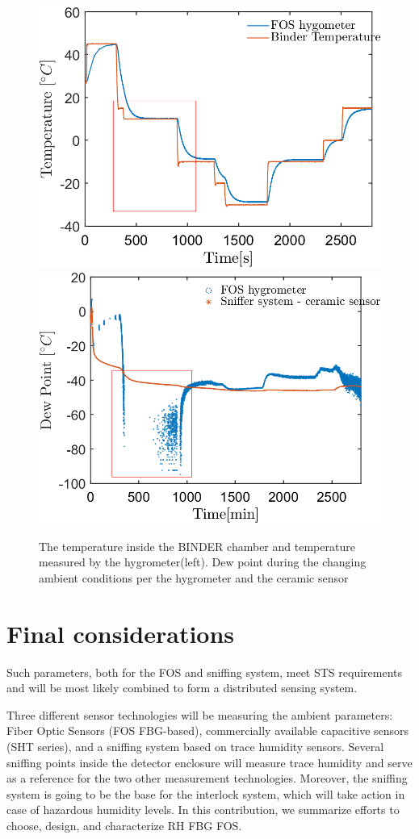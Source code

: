\begin{figure}[!h]
\centering
\includegraphics[width=0.47\columnwidth]{Chapter5/images/FOS_performance_T.png}
\includegraphics[width=0.47\columnwidth]{Chapter5/images/FOS_performance1.png}
\caption{The temperature inside the BINDER chamber and temperature measured by the hygrometer(left). Dew point during the changing ambient conditions per the hygrometer and the ceramic sensor}
\label{Tfig_comparison_2}
\end{figure}

\newpage
\section{Final considerations}
Such parameters, both for the \gls{FOS} and sniffing system, meet \gls{STS} requirements and will be most likely combined to form a distributed sensing system.


Three different sensor technologies will be measuring the ambient parameters: Fiber Optic Sensors (FOS FBG-based), commercially available capacitive sensors (SHT series), and a sniffing system based on trace humidity sensors.
Several sniffing points inside the detector enclosure will measure trace humidity and serve as a  reference for the two other measurement technologies. Moreover, the sniffing system is going to be the base for the interlock system, which will take action in case of hazardous humidity levels. In this contribution, we summarize efforts to choose, design, and characterize RH FBG FOS.